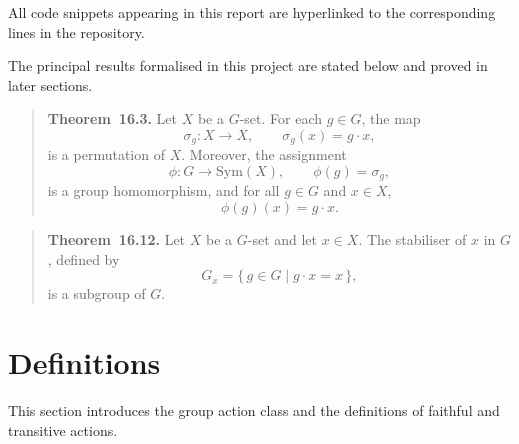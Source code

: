 \documentclass[
  12pt, %
]{assignment}
\begin{document}
All code snippets appearing in this report are hyperlinked to the corresponding
lines in the repository.

The principal results formalised in this project are stated below and proved in
later sections.

\begin{quote}
	\textbf{Theorem~16.3.}
	Let $X$ be a $G$-set. For each $g \in G$, the map
	\[
		\sigma_g : X \to X, \qquad \sigma_g(x) = g \cdot x,
	\]
	is a permutation of $X$. Moreover, the assignment
	\[
		\phi : G \to \mathrm{Sym}(X), \qquad \phi(g) = \sigma_g,
	\]
	is a group homomorphism, and for all $g \in G$ and $x \in X$,
	\[
		\phi(g)(x) = g \cdot x.
	\]
\end{quote}

\begin{quote}
	\textbf{Theorem~16.12.}
	Let $X$ be a $G$-set and let $x \in X$. The stabiliser of $x$ in $G$,
	defined by
	\[
		G_x = \{\, g \in G \mid g \cdot x = x \,\},
	\]
	is a subgroup of $G$.
\end{quote}

\section{Definitions}
This section introduces the group action class and the definitions of faithful and transitive actions.
\end{document}
